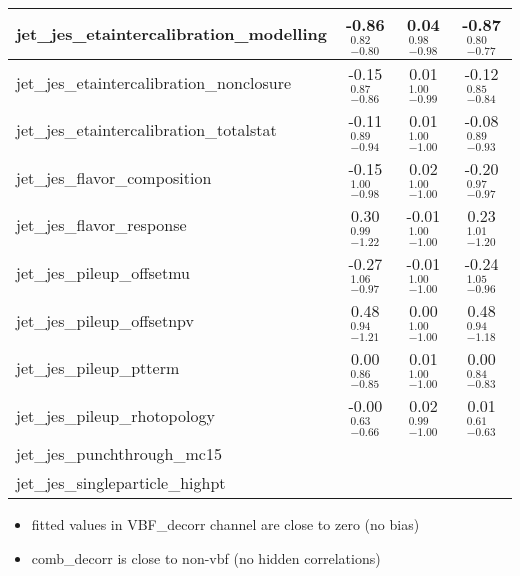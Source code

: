 \documentclass{beamer}
\begin{document}
\begin{frame}
\begin{table}
{{\begin{tabular}{| l | c | c | c|}
jet\_jes\_etaintercalibration\_modelling &  -0.86 \boldmath${^{ 0.82}_{-0.80}}$      &  0.04 \boldmath${^{ 0.98}_{-0.98}}$   &  -0.87 \boldmath${^{ 0.80}_{-0.77}}$      \\ \hline
jet\_jes\_etaintercalibration\_nonclosure& -0.15 \boldmath${^{ 0.87}_{-0.86}}$      &  0.01 \boldmath${^{ 1.00}_{-0.99}}$   &  -0.12 \boldmath${^{ 0.85}_{-0.84}}$      \\ \hline
jet\_jes\_etaintercalibration\_totalstat & -0.11 \boldmath${^{ 0.89}_{-0.94}}$      &  0.01 \boldmath${^{ 1.00}_{-1.00}}$   & -0.08 \boldmath${^{ 0.89}_{-0.93}}$     \\ \hline
jet\_jes\_flavor\_composition            &  -0.15 \boldmath${^{ 1.00}_{-0.98}}$      &  0.02 \boldmath${^{ 1.00}_{-1.00}}$   &  -0.20 \boldmath${^{ 0.97}_{-0.97}}$      \\ \hline
jet\_jes\_flavor\_response               &0.30 \boldmath${^{ 0.99}_{-1.22}}$      & -0.01 \boldmath${^{ 1.00}_{-1.00}}$   & 0.23 \boldmath${^{ 1.01}_{-1.20}}$      \\ \hline
jet\_jes\_pileup\_offsetmu               & -0.27 \boldmath${^{ 1.06}_{-0.97}}$     & -0.01 \boldmath${^{ 1.00}_{-1.00}}$   &-0.24 \boldmath${^{ 1.05}_{-0.96}}$      \\ \hline
jet\_jes\_pileup\_offsetnpv              & 0.48 \boldmath${^{ 0.94}_{-1.21}}$     &  0.00 \boldmath${^{ 1.00}_{-1.00}}$   &  0.48 \boldmath${^{ 0.94}_{-1.18}}$      \\ \hline
jet\_jes\_pileup\_ptterm                 &  0.00 \boldmath${^{ 0.86}_{-0.85}}$      &  0.01 \boldmath${^{ 1.00}_{-1.00}}$   &  0.00 \boldmath${^{ 0.84}_{-0.83}}$      \\ \hline
jet\_jes\_pileup\_rhotopology            & -0.00 \boldmath${^{ 0.63}_{-0.66}}$      &  0.02 \boldmath${^{ 0.99}_{-1.00}}$   & 0.01 \boldmath${^{ 0.61}_{-0.63}}$      \\ \hline
jet\_jes\_punchthrough\_mc15             &                                        &                                       &                                        \\ \hline
jet\_jes\_singleparticle\_highpt         &                                        &                                       &                                        \\ \hline

\end{tabular}
}}
\end{table}

\begin{itemize}
  \item fitted values in VBF\_decorr channel are close to zero (no bias)
  \item comb\_decorr is close to non-vbf (no hidden correlations)
 \end{itemize}

\end{frame}
\end{document}
